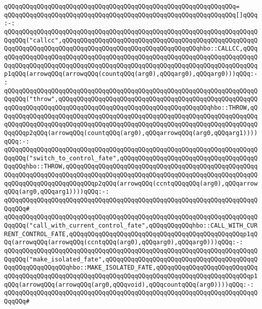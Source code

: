 \verb|qQQqqQQqqQQqqQQqqQQqqQQqqQQqqQQqqQQqqQQqqQQqqQQqqQQqqQQqqQQqqQQq=|\newline
\verb|qQQqqQQqqQQqqQQqqQQqqQQqqQQqqQQqqQQqqQQqqQQqqQQqqQQqqQQqqQQqqQQq[]qQQq:-:|\newline
\verb|qQQqqQQqqQQqqQQqqQQqqQQqqQQqqQQqqQQqqQQqqQQqqQQqqQQqqQQqqQQqqQQqqQQqqQQqqQQq("callcc",qQQqqQQqqQQqqQQqqQQqqQQqqQQqqQQqqQQqqQQqqQQqqQQqqQQqqQQqqQQqqQQqqQQqqQQqqQQqqQQqqQQqqQQqqQQqqQQqqQQqqQQqqQQqhbo::CALLCC,qQQqqQQqqQQqqQQqqQQqqQQqqQQqqQQqqQQqqQQqqQQqqQQqqQQqqQQqqQQqqQQqqQQqqQQqqQQqqQQqqQQqqQQqqQQqqQQqqQQqqQQqqQQqqQQqqQQqqQQqqQQqqQQqqQQqqQQqqQQqqQQqp1qQQq(arrowqQQq(arrowqQQq(countqQQq(arg0),qQQqarg0),qQQqarg0)))qQQq:-:|\newline
\verb|qQQqqQQqqQQqqQQqqQQqqQQqqQQqqQQqqQQqqQQqqQQqqQQqqQQqqQQqqQQqqQQqqQQqqQQqqQQq("throw",qQQqqQQqqQQqqQQqqQQqqQQqqQQqqQQqqQQqqQQqqQQqqQQqqQQqqQQqqQQqqQQqqQQqqQQqqQQqqQQqqQQqqQQqqQQqqQQqqQQqqQQqqQQqqQQqhbo::THROW,qQQqqQQqqQQqqQQqqQQqqQQqqQQqqQQqqQQqqQQqqQQqqQQqqQQqqQQqqQQqqQQqqQQqqQQqqQQqqQQqqQQqqQQqqQQqqQQqqQQqqQQqqQQqqQQqqQQqqQQqqQQqqQQqqQQqqQQqqQQqqQQqqQQqp2qQQq(arrowqQQq(countqQQq(arg0),qQQqarrowqQQq(arg0,qQQqarg1))))qQQq:-:|\newline
\verb|qQQqqQQqqQQqqQQqqQQqqQQqqQQqqQQqqQQqqQQqqQQqqQQqqQQqqQQqqQQqqQQqqQQqqQQqqQQq("switch_to_control_fate",qQQqqQQqqQQqqQQqqQQqqQQqqQQqqQQqqQQqqQQqqQQqhbo::THROW,qQQqqQQqqQQqqQQqqQQqqQQqqQQqqQQqqQQqqQQqqQQqqQQqqQQqqQQqqQQqqQQqqQQqqQQqqQQqqQQqqQQqqQQqqQQqqQQqqQQqqQQqqQQqqQQqqQQqqQQqqQQqqQQqqQQqqQQqqQQqqQQqqQQqp2qQQq(arrowqQQq(ccntqQQqqQQq(arg0),qQQqarrowqQQq(arg0,qQQqarg1))))qQQq:-:|\newline
\verb|qQQqqQQqqQQqqQQqqQQqqQQqqQQqqQQqqQQqqQQqqQQqqQQqqQQqqQQqqQQqqQQqqQQqqQQqqQQq#|\newline
\verb|qQQqqQQqqQQqqQQqqQQqqQQqqQQqqQQqqQQqqQQqqQQqqQQqqQQqqQQqqQQqqQQqqQQqqQQqqQQq("call_with_current_control_fate",qQQqqQQqqQQqhbo::CALL_WITH_CURRENT_CONTROL_FATE,qQQqqQQqqQQqqQQqqQQqqQQqqQQqqQQqqQQqqQQqqQQqqQQqp1qQQq(arrowqQQq(arrowqQQq(ccntqQQq(arg0),qQQqarg0),qQQqarg0)))qQQq:-:|\newline
\verb|qQQqqQQqqQQqqQQqqQQqqQQqqQQqqQQqqQQqqQQqqQQqqQQqqQQqqQQqqQQqqQQqqQQqqQQqqQQq("make_isolated_fate",qQQqqQQqqQQqqQQqqQQqqQQqqQQqqQQqqQQqqQQqqQQqqQQqqQQqqQQqqQQqhbo::MAKE_ISOLATED_FATE,qQQqqQQqqQQqqQQqqQQqqQQqqQQqqQQqqQQqqQQqqQQqqQQqqQQqqQQqqQQqqQQqqQQqqQQqqQQqqQQqqQQqqQQqqQQqqQQqp1qQQq(arrowqQQq(arrowqQQq(arg0,qQQqvoid),qQQqcountqQQq(arg0))))qQQq:-:|\newline
\verb|qQQqqQQqqQQqqQQqqQQqqQQqqQQqqQQqqQQqqQQqqQQqqQQqqQQqqQQqqQQqqQQqqQQqqQQqqQQq#|\newline
